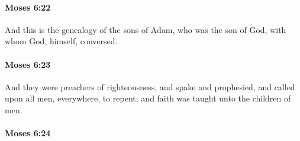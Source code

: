 
		\paragraph{Moses 6:22} %
			\label{MOSES-6-22}

			And this is the genealogy of the sons of Adam, who was the son of God, with whom God, himself, conversed.


		\paragraph{Moses 6:23} %
			\label{MOSES-6-23}

			And they were preachers of righteousness, and spake and prophesied, and called upon all men, everywhere, to repent; and faith was taught unto the children of men.


		\paragraph{Moses 6:24} %
			\label{MOSES-6-24}

